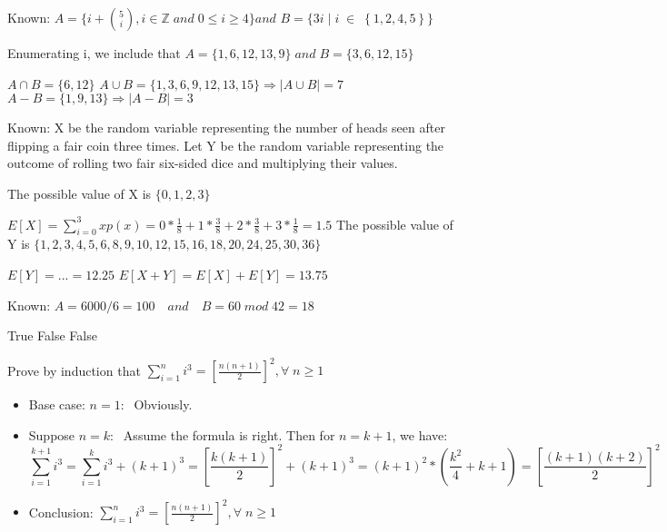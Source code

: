 \documentclass[12pt,twoside]{article}
\begin{document}

\begin{problems}

\problem  %

Known: $A=\{i+\binom{5}{i}, i\in \mathbb{Z} \; and \;0 \le i \ge 4\} and $
$B=\{3i\;|\;i \; \in \; \left\{1,2,4,5\right\}\}$

Enumerating i, we include that $A=\{1,6,12,13,9\} \; and \;B=\{3,6,12,15\}$
\begin{problemparts}
\problempart %
$A \cap B=\{6,12\}$
\problempart %
$A \cup B=\{1,3,6,9,12,13,15\} \Rightarrow |A \cup B|=7$
\problempart %
$A-B=\{1,9,13\}\Rightarrow|A-B|=3$
\end{problemparts}

\problem  %
Known: X be the random variable representing the number of heads seen after flipping 
a fair coin three times. Let Y be the random variable representing the outcome of rolling two fair 
six-sided dice and multiplying their values.
\begin{problemparts}
\problempart %
The possible value of X is $\{0,1,2,3\}$

$E[X]=\sum_{i=0}^{3}xp(x)=0*\frac{1}{8}+1*\frac{3}{8}+2*\frac{3}{8}+3*\frac{1}{8}=1.5$
\problempart %
The possible value of Y is $\{1,2,3,4,5,6,8,9,10,12,15,16,18,20,24,25,30,36\}$

$E[Y]=...=12.25$
\problempart %
$E[X+Y]=E[X]+E[Y]=13.75$
\end{problemparts}

\problem  %
Known: $A=6000/6=100\quad and \quad B=60\;mod\;42=18$
\begin{problemparts}
\problempart %
True
\problempart %
False
\problempart %
False
\end{problemparts}

\problem  %
Prove by induction that $\sum_{i=1}^{n}i^3=\left[\frac{n(n+1)}{2}\right]^2, \forall \;n\ge1$

\begin{itemize}
    \item \;Base case: $n=1:\;$ Obviously.
    \item \;Suppose $n=k:\;$ Assume the formula is right. Then for $n=k+1$, we have:
    $$
    \sum_{i=1}^{k+1}i^3=\sum_{i=1}^{k}i^3+(k+1)^3=\left[\frac{k(k+1)}{2}\right]^2+(k+1)^3
    =(k+1)^2*(\frac{k^2}{4}+k+1)=\left[\frac{(k+1)(k+2)}{2}\right]^2
    $$
    \item \;Conclusion: $\sum_{i=1}^{n}i^3=\left[\frac{n(n+1)}{2}\right]^2, \forall \;n\ge1$
\end{itemize}


\end{problems}
\end{document}
